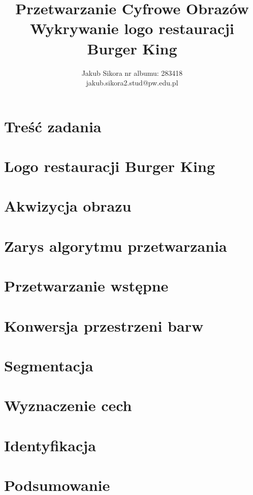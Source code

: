 \documentclass{article}
\title{Przetwarzanie Cyfrowe Obrazów \\ Wykrywanie logo restauracji Burger King}
\author{
Jakub Sikora
\affiliations
nr albumu: 283418\\
\emails
jakub.sikora2.stud@pw.edu.pl
}
\newcommand{\bk}{
    Burger King
}
\begin{document}
\maketitle

\section{Treść zadania}
\label{sec:cel-projektu}


\section{Logo restauracji \bk}
\label{sec:logo-bk}


\section{Akwizycja obrazu}
\label{sec:akwizycja-obrazu}


\section{Zarys algorytmu przetwarzania}
\label{sec:algorytm}


\section{Przetwarzanie wstępne}
\label{sec:preprocessing}


\section{Konwersja przestrzeni barw}
\label{sec:przestrzenie}


\section{Segmentacja}
\label{sec:segmentacja}


\section{Wyznaczenie cech}
\label{sec:wyznaczanie-cech}


\section{Identyfikacja}
\label{sec:identyfikacja-cech}


\section{Podsumowanie}
\label{sec:podsumowanie}




\end{document}
